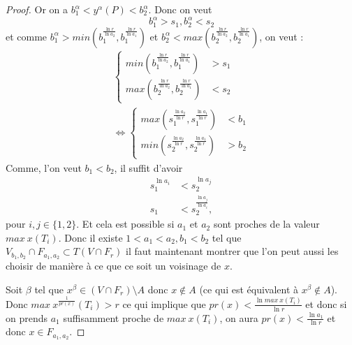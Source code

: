 \documentclass[11pt]{article}
\begin{document}
\begin{proof}
Or on a $b_1^\alpha < y^\alpha(P) <b_2^\alpha$.  Donc on veut 
\begin{equation*}
b_1^\alpha > s_1, b_2^\alpha < s_2
\end{equation*}
et comme $b_1^\alpha > min (b_1^\frac{\ln r}{\ln a_2}, b_1^\frac{\ln r}{\ln a_1})$ et $b_2^\alpha < max (b_2^\frac{\ln r}{\ln a_2}, b_2^\frac{\ln r}{\ln a_1})$, on veut :
\begin{align*}
\left\{
    \begin{array}{ll}
        min (b_1^\frac{\ln r}{\ln a_2}, b_1^\frac{\ln r}{\ln a_1}) &> s_1 \\
        max (b_2^\frac{\ln r}{\ln a_2}, b_2^\frac{\ln r}{\ln a_1}) &< s_2 
    \end{array}
\right.\\
\iff
\left\{
    \begin{array}{ll}
        max (s_1^\frac{\ln a_2}{\ln r}, s_1^\frac{\ln a_1}{\ln r}) &< b_1 \\
        min (s_2^\frac{\ln a_2}{\ln r}, s_2^\frac{\ln a_1}{\ln r}) &> b_2 
    \end{array}
\right.
\end{align*} 
Comme, l'on veut $b_1 < b_2$, il suffit d'avoir 
\begin{align*}
s_1^{\ln a_i} &< s_2^{\ln a_j}\\
s_1 &< s_2 ^{\frac{\ln a_j}{\ln a_i}},
\end{align*}
pour $i,j \in \lbrace 1,2 \rbrace$. Et cela est possible si $a_1$ et $a_2$ sont proches de la valeur $max~x(T_i)$. Donc il existe $1 < a_1 < a_2, b_1 < b_2$ tel que $V_{b_1, b_2} \cap F_{a_1, a_2} \subset T(V\cap F_r)$ il faut maintenant montrer que l'on peut aussi les choisir de manière à ce que ce soit un voisinage de $x$. 

Soit $\beta$ tel que $x^\beta \in (V\cap F_r)\setminus A$ donc $x \notin A$ (ce qui est équivalent à $x^\beta \notin A$). Donc $max~x^{\frac{1}{pr(x)}} (T_i)>r$ ce qui implique que $pr(x) < \frac{\ln max~x(T_i)}{\ln r}$ et donc si on prends $a_1$ suffisamment proche de $max~x(T_i)$, on aura $pr(x) < \frac{\ln a_1}{\ln r}$ et donc $x \in F_{a_1,a_2}$.


\end{proof}
\end{document}

